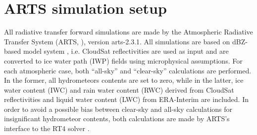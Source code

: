 \documentclass[amt, manuscript]{copernicus}
\begin{document}



\appendix
\section{ARTS simulation setup}    %
\label{appendix:ARTS_setup}
%
All radiative transfer forward simulations are made by the Atmospheric Radiative
Transfer System (ARTS, \citet{eriksson:arts2:11,buehler:artst:18}), version
arts-2.3.1. All simulations are based on dBZ-based model system \citep{ekelund2020using}, i.e. CloudSat reflectivities are used as input and are converted to ice water path (IWP) fields using microphysical assumptions. For each atmospheric case, both ``all-sky'' and ``clear-sky'' calculations are performed. In the former, all hydrometeors contents are set to zero, while in the latter, ice water content (IWC) and rain water content (RWC) derived from CloudSat reflectivities and liquid water content (LWC) from ERA-Interim \citep{dee2011erainterim} are included. In order to avoid a possible bias between clear-sky and all-sky calculations for insignificant hydrometeor contents, both calculations are made by ARTS's interface to the RT4 solver \citep{evans1995microwavec}.
\end{document}
